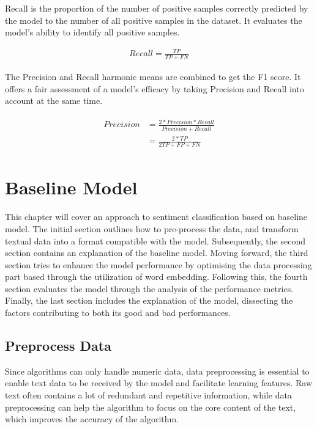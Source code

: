 \documentclass[ %
                    author={Bocheng Wang},
                supervisor={Dr. Qiang Liu},
                    degree={MSc},
                     title={A Research on Identification of Suicide Ideation in Texts with Multiple Models},
                      type={},
                      year={2024}]{dissertation}
\begin{document}
Recall is the proportion of the number of positive samples correctly predicted by the model to the number of all positive samples in the dataset. It evaluates the model's ability to identify all positive samples.

\begin{eqnarray}
      Recall = \frac{TP}{TP + FN}
      \label{rec}
\end{eqnarray}

The Precision and Recall harmonic means are combined to get the F1 score. It offers a fair assessment of a model's efficacy by taking Precision and Recall into account at the same time.

\begin{eqnarray}
      \begin{aligned}
            Precision &= \frac{2\ast Precision \ast Recall}{Precision + Recall} \\
                      &= \frac{2\ast TP}{2 TP + FP + FN}
      \end{aligned}
      \label{f1s}
\end{eqnarray}



\chapter{Baseline Model}
\label{chap:execution1}
\noindent
This chapter will cover an approach to sentiment classification based on baseline model. The initial section outlines how to pre-process the data, and transform textual data into a format compatible with the model. Subsequently, the second section contains an explanation of the baseline model. Moving forward, the third section tries to enhance the model performance by optimising the data processing part based through the utilization of word embedding. Following this, the fourth section evaluates the model through the analysis of the performance metrics. Finally, the last section includes the explanation of the model, dissecting the factors contributing to both its good and bad performances.

\section{Preprocess Data}
\noindent
Since algorithms can only handle numeric data, data preprocessing is essential to enable text data to be received by the model and facilitate learning features. Raw text often contains a lot of redundant and repetitive information, while data preprocessing can help the algorithm to focus on the core content of the text, which improves the accuracy of the algorithm.
\end{document}

